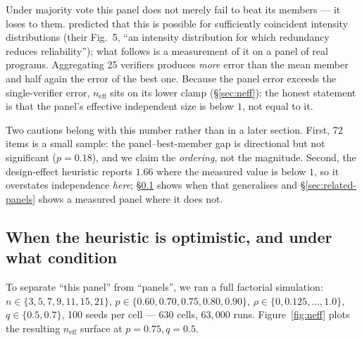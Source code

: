 \documentclass[11pt,a4paper]{article}
\newcommand{\neff}{n_{\mathrm{eff}}}
\begin{document}
Under majority vote this panel does not merely fail to beat its members --- it
loses to them. \citet{eckhardt1985} predicted that this is possible for
sufficiently coincident intensity distributions (their Fig.~5, ``an intensity
distribution for which redundancy reduces reliability''); what follows is a
measurement of it on a panel of real programs. Aggregating 25 verifiers produces \emph{more} error than the mean
member and half again the error of the best one. Because the panel error exceeds
the single-verifier error, $\neff$ sits on its lower clamp
(\S\ref{sec:neff}): the honest statement is that the panel's effective
independent size is below $1$, not equal to it.

Two cautions belong with this number rather than in a later section. First, 72
items is a small sample: the panel--best-member gap is directional but not
significant ($p = 0.18$), and we claim the \emph{ordering}, not the magnitude.
Second, the design-effect heuristic reports $1.66$ where the measured value is
below $1$, so it overstates independence \emph{here}; \S\ref{sec:grid} shows when
that generalises and \S\ref{sec:related-panels} shows a measured panel where it
does not.

\subsection{When the heuristic is optimistic, and under what condition}
\label{sec:grid}

To separate ``this panel'' from ``panels'', we ran a full factorial simulation:
$n \in \{3,5,7,9,11,15,21\}$, $p \in \{0.60,0.70,0.75,0.80,0.90\}$,
$\rho \in \{0, 0.125, \dots, 1.0\}$, $q \in \{0.5, 0.7\}$, 100 seeds per cell ---
630 cells, $63{,}000$ runs. Figure~\ref{fig:neff} plots the resulting $\neff$
surface at $p = 0.75, q = 0.5$.
\end{document}

